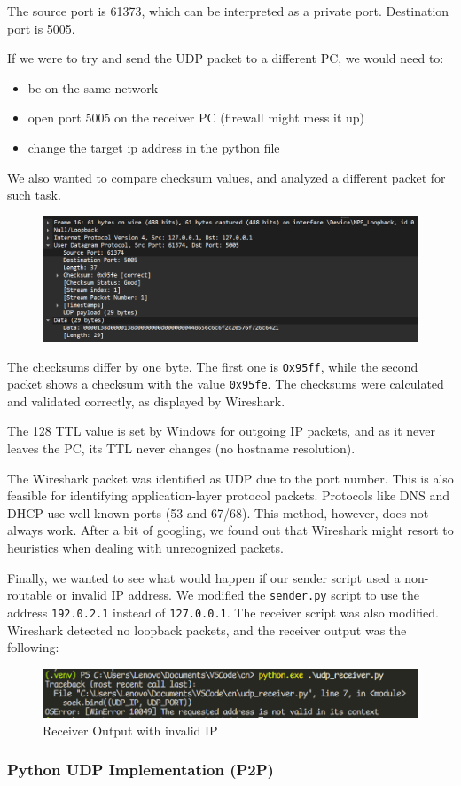 The source port is 61373, which can be interpreted as a private port.
Destination port is 5005.

If we were to try and send the UDP packet to a different PC, we would need to:

\begin{itemize}
	\item be on the same network
	\item open port 5005 on the receiver PC (firewall might mess it up)
	\item change the target ip address in the python file
\end{itemize}

We also wanted to compare checksum values, and analyzed a different packet for
such task.

\begin{figure}[htbp]
	\centering
	\includegraphics[width=1\linewidth]{img/second_exp/4.png}
	\caption{}\label{fig:2_4}
\end{figure}

The checksums differ by one byte. The first one is \texttt{Ox95ff}, while the
second packet shows a checksum with the value \texttt{0x95fe}. The checksums
were calculated and validated correctly, as displayed by Wireshark.

The 128 TTL value is set by Windows for outgoing IP packets, and as it never
leaves the PC, its TTL never changes (no hostname resolution).

The Wireshark packet was identified as UDP due to the port number. This is also
feasible for identifying application-layer protocol packets. Protocols like DNS
and DHCP use well-known ports (53 and 67/68). This method, however, does not
always work. After a bit of googling, we found out that Wireshark might resort
to heuristics when dealing with unrecognized packets.

Finally, we wanted to see what would happen if our sender script used a
non-routable or invalid IP address. We modified the \texttt{sender.py} script
to use the address \texttt{192.0.2.1} instead of \texttt{127.0.0.1}. The
receiver script was also modified. Wireshark detected no loopback packets, and
the receiver output was the following:

\begin{figure}[htbp]
	\centering
	\includegraphics[width=1\linewidth]{img/second_exp/5.png}
	\caption{Receiver Output with invalid IP}\label{fig:2_5}
\end{figure}

\subsubsection{Python UDP Implementation (P2P)}
